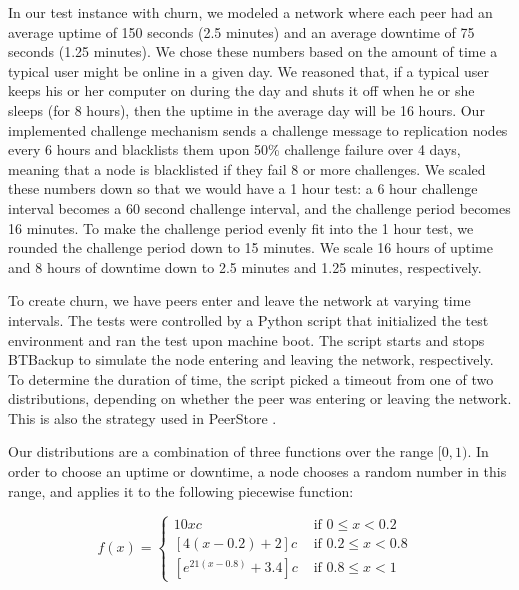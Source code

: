 \documentclass[12pt]{report}
\begin{document}
In our test instance with churn, we modeled a network where each peer had an average uptime of 150 seconds (2.5 minutes) and an average downtime of 75 seconds (1.25 minutes). We chose these numbers based on the amount of time a typical user might be online in a given day. We reasoned that, if a typical user keeps his or her computer on during the day and shuts it off when he or she sleeps (for 8 hours), then the uptime in the average day will be 16 hours. Our implemented challenge mechanism sends a challenge message to replication nodes every 6 hours and blacklists them upon 50\% challenge failure over 4 days, meaning that a node is blacklisted if they fail 8 or more challenges. We scaled these numbers down so that we would have a 1 hour test: a 6 hour challenge interval becomes a 60 second challenge interval, and the challenge period becomes 16 minutes. To make the challenge period evenly fit into the 1 hour test, we rounded the challenge period down to 15 minutes. We scale 16 hours of uptime and 8 hours of downtime down to 2.5 minutes and 1.25 minutes, respectively.

To create churn, we have peers enter and leave the network at varying time intervals. The tests were controlled by a Python script that initialized the test environment and ran the test upon machine boot. The script starts and stops BTBackup to simulate the node entering and leaving the network, respectively. To determine the duration of time, the script picked a timeout from one of two distributions, depending on whether the peer was entering or leaving the network.  This is also the strategy used in PeerStore \cite{PeerStore}.

Our distributions are a combination of three functions over the range $[0,1)$. In order to choose an uptime or downtime, a node chooses a random number in this range, and applies it to the following piecewise function:

$$
f(x)=
\begin{cases}
10xc & \mbox{ if $0 \leq x < 0.2$ } \\
[4(x-0.2)+2]c & \mbox{ if $0.2 \leq x < 0.8$ } \\
[e^{21(x-0.8)}+3.4]c & \mbox{ if $0.8 \leq x < 1$ }
\end{cases}
$$
\end{document}
